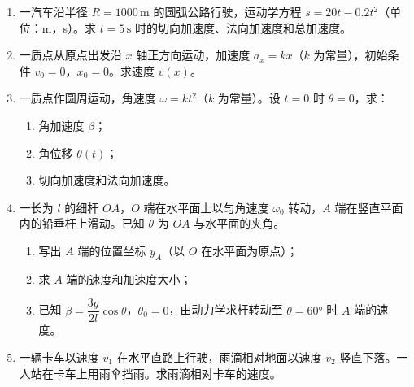 \documentclass[12pt]{article}
\begin{document}
\begin{enumerate}[label=\textbf{例\arabic*.}, leftmargin=*]
\item 一汽车沿半径 $R = 1000\,\mathrm{m}$ 的圆弧公路行驶，运动学方程 $s = 20t - 0.2t^2$（单位：m，s）。求 $t = 5\,\mathrm{s}$ 时的切向加速度、法向加速度和总加速度。

\item 一质点从原点出发沿 $x$ 轴正方向运动，加速度 $a_x = kx$（$k$ 为常量），初始条件 $v_0 = 0$，$x_0 = 0$。求速度 $v(x)$。

\item 一质点作圆周运动，角速度 $\omega = k t^2$（$k$ 为常量）。设 $t=0$ 时 $\theta=0$，求：
\begin{enumerate}[label=(\arabic*)]
  \item 角加速度 $\beta$；
  \item 角位移 $\theta(t)$；
  \item 切向加速度和法向加速度。
\end{enumerate}

\item 一长为 $l$ 的细杆 $OA$，$O$ 端在水平面上以匀角速度 $\omega_0$ 转动，$A$ 端在竖直平面内的铅垂杆上滑动。已知 $\theta$ 为 $OA$ 与水平面的夹角。
\begin{enumerate}[label=(\arabic*)]
  \item 写出 $A$ 端的位置坐标 $y_A$（以 $O$ 在水平面为原点）；
  \item 求 $A$ 端的速度和加速度大小；
  \item 已知 $\beta = \dfrac{3g}{2l}\cos\theta$，$\theta_0 = 0$，由动力学求杆转动至 $\theta = 60°$ 时 $A$ 端的速度。
\end{enumerate}

\item 一辆卡车以速度 $v_1$ 在水平直路上行驶，雨滴相对地面以速度 $v_2$ 竖直下落。一人站在卡车上用雨伞挡雨。求雨滴相对卡车的速度。

\end{enumerate}
\end{document}
